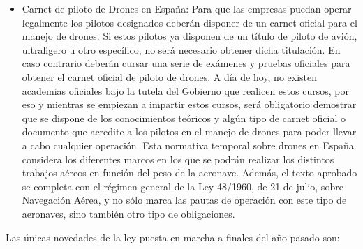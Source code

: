 \begin{itemize}
		\item Carnet de piloto de Drones en España: Para que las empresas puedan operar legalmente los pilotos designados deberán disponer de un carnet oficial para el manejo de drones. Si estos pilotos ya disponen de un título de piloto de avión, ultraligero u otro específico, no será necesario obtener dicha titulación. En caso contrario deberán cursar una serie de exámenes y pruebas oficiales para obtener el carnet oficial de piloto de drones. A día de hoy, no existen academias oficiales bajo la tutela del Gobierno que realicen estos cursos, por eso y mientras se empiezan a impartir estos cursos, será obligatorio demostrar que se dispone de los conocimientos teóricos y algún tipo de carnet oficial o documento que acredite a los pilotos en el manejo de drones para poder llevar a cabo cualquier operación. Esta normativa temporal sobre drones en España considera los diferentes marcos en los que se podrán realizar los distintos trabajos aéreos en función del peso de la aeronave. Además, el texto aprobado se completa con el régimen general de la Ley 48/1960, de 21 de julio, sobre Navegación Aérea, y no sólo marca las pautas de operación con este tipo de aeronaves, sino también otro tipo de obligaciones.
	\end{itemize}
	
\hspace{-1cm} Las únicas novedades de la ley puesta en marcha a finales del año pasado son:

